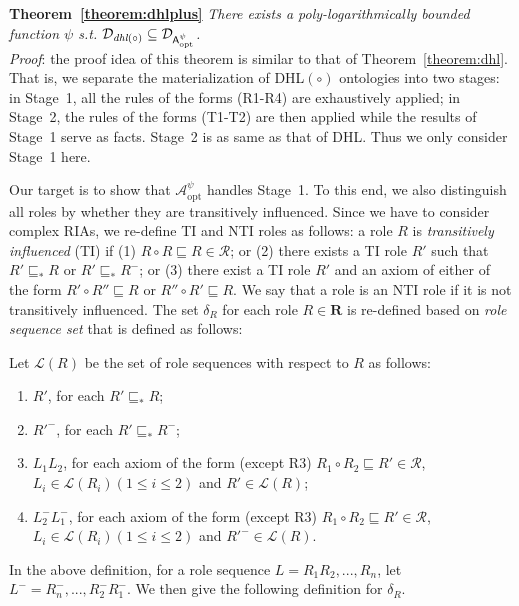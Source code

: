 \textbf{Theorem~\ref{theorem:dhlplus}}
\emph{There exists a poly-logarithmically bounded function $\psi$ s.t. $\mathcal{D}_{\textit{\text{dhl}}(\circ)}\subseteq\mathcal{D}_{\mathsf{A}_{\text{opt}}^{\psi}}$.}\\

\noindent\emph{Proof}: the proof idea of this theorem is similar to that of Theorem~\ref{theorem:dhl}.
That is, we separate the materialization of DHL$(\circ)$ ontologies into two stages: in Stage~1,
all the rules of the forms (R1-R4) are exhaustively applied; in Stage~2, the rules of the forms (T1-T2)
are then applied while the results of Stage~1 serve as facts. Stage~2 is as same as that of DHL.
Thus we only consider Stage~1 here.

Our target is to show that $\mathcal{A}_{\text{opt}}^\psi$ handles Stage~1. To this end, we also
distinguish all roles by whether they are transitively influenced. Since we have to consider
complex RIAs, we re-define TI and NTI roles as follows:
a role $R$ is \emph{transitively influenced} (TI)
if (1) $R\circ R\sqsubseteq R\in\mathcal{R}$; or
(2) there exists a TI role $R'$ such that $R'\sqsubseteq_*R$ or $R'\sqsubseteq_*R^-$;
or (3) there exist a TI role $R'$ and an axiom of either of the form
$R'\circ R''\sqsubseteq R$ or $R''\circ R'\sqsubseteq R$.
We say that a role is an NTI role if it is not transitively influenced.
The set $\delta_R$ for each role $R\in\textbf{R}$ is re-defined based on \emph{role sequence set}
that is defined as follows:

\begin{definition}\label{def:language}
Let $\mathcal{L}(R)$ be the set of role sequences with respect to $R$ as follows:
 \begin{enumerate}[leftmargin=4ex,label=\arabic*.]
\item $R'$, for each $R'\sqsubseteq_* R$;
\item $R'^-$, for each $R'\sqsubseteq_* R^-$;
\item $L_1L_2$, for each axiom of the form (except R3) $R_1\circ R_2\sqsubseteq R'\in\mathcal{R}$, $L_i\in\mathcal{L}(R_i)(1\leq i\leq 2)$ and $R'\in\mathcal{L}(R)$;
\item $L_2^-L_1^-$, for each axiom of the form (except R3) $R_1\circ R_2\sqsubseteq R'\in\mathcal{R}$, $L_i\in\mathcal{L}(R_i)(1\leq i\leq 2)$ and $R'^-\in\mathcal{L}(R)$.
\end{enumerate}
\end{definition}

In the above definition, for a role sequence $L=R_1R_2,...,R_n$, let $L^-=R_n^-,...,R_2^-R_1^-$.
We then give the following definition for $\delta_R$.

